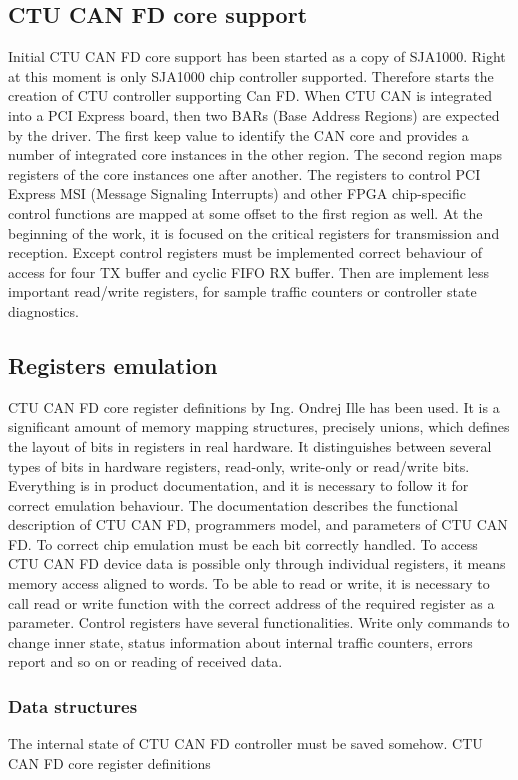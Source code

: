 \documentclass{ctuthesis}
\begin{document}
 \subsection{CTU CAN FD core support}
  Initial CTU CAN FD core support has been started as a copy of SJA1000. Right at this moment is only SJA1000 chip controller supported. Therefore starts the creation of CTU controller supporting Can FD.
  When CTU CAN is integrated into a PCI Express board, then two BARs (Base Address Regions) are expected by the driver. The first keep value to identify the CAN core and provides a number of integrated core instances in the other region. The second region maps registers of the core instances one after another. The registers to control PCI Express MSI (Message Signaling Interrupts) and other FPGA chip-specific control functions are mapped at some offset to the first region as well. At the beginning of the work, it is focused on the critical registers for transmission and reception. Except control registers must be implemented correct behaviour of access for four TX buffer and cyclic FIFO RX buffer. Then are implement less important read/write registers, for sample traffic counters or controller state diagnostics.
 
 \subsection{Registers emulation}
  CTU CAN FD core register definitions by Ing. Ondrej Ille has been used. It is a significant amount of memory mapping structures, precisely unions, which defines the layout of bits in registers in real hardware. It distinguishes between several types of bits in hardware registers, read-only, write-only or read/write bits. Everything is in product documentation, and it is necessary to follow it for correct emulation behaviour. The documentation describes the functional description of CTU CAN FD, programmers model, and parameters of CTU CAN FD. To correct chip emulation must be each bit correctly handled. To access CTU CAN FD device data is possible only through individual registers, it means memory access aligned to words. To be able to read or write, it is necessary to call read or write function with the correct address of the required register as a parameter.
  Control registers have several functionalities. Write only commands to change inner state, status information about internal traffic counters, errors report and so on or reading of received data.
 
  \subsubsection{Data structures}
  The internal state of CTU CAN FD controller must be saved somehow. CTU CAN FD core register definitions
 
\end{document}
